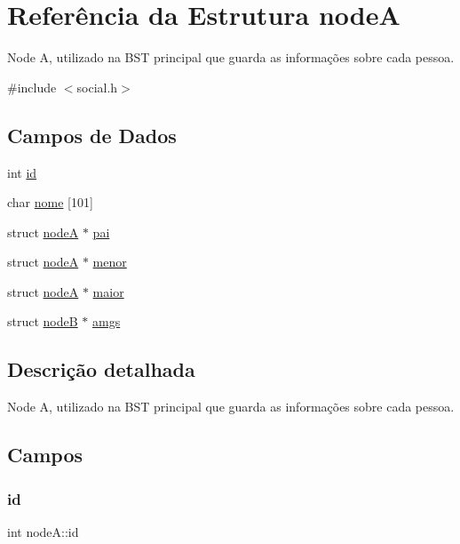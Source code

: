 \hypertarget{structnodeA}{}\section{Referência da Estrutura nodeA}
\label{structnodeA}


Node A, utilizado na B\+ST principal que guarda as informações sobre cada pessoa.  




{\ttfamily \#include $<$social.\+h$>$}

\subsection*{Campos de Dados}
\begin{DoxyCompactItemize}
\item 
int \mbox{\hyperlink{structnodeA_a3afa6c3b262465d9ff1e0103cd36acb2}{id}}
\item 
char \mbox{\hyperlink{structnodeA_abb21dead329c9c152aaf2544337b26d7}{nome}} \mbox{[}101\mbox{]}
\item 
struct \mbox{\hyperlink{structnodeA}{nodeA}} $\ast$ \mbox{\hyperlink{structnodeA_a0ff9bb5e43589704c3ce4eb4434d76af}{pai}}
\item 
struct \mbox{\hyperlink{structnodeA}{nodeA}} $\ast$ \mbox{\hyperlink{structnodeA_a240c2a666e348701276be151d0dc6f9a}{menor}}
\item 
struct \mbox{\hyperlink{structnodeA}{nodeA}} $\ast$ \mbox{\hyperlink{structnodeA_af3a6276035abe3f5912b42d5334b84f2}{maior}}
\item 
struct \mbox{\hyperlink{structnodeB}{nodeB}} $\ast$ \mbox{\hyperlink{structnodeA_a618b5972693f9ff48d59387eced6eb09}{amgs}}
\end{DoxyCompactItemize}


\subsection{Descrição detalhada}
Node A, utilizado na B\+ST principal que guarda as informações sobre cada pessoa. 

\subsection{Campos}
\mbox{\label{structnodeA_a3afa6c3b262465d9ff1e0103cd36acb2}} 
\subsubsection{\texorpdfstring{id}{id}}
{\footnotesize\ttfamily int node\+A\+::id}

